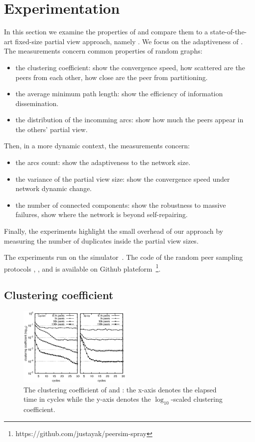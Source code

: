 \section{Experimentation}
\label{sec:experiments}

In this section we examine the properties of \SPRAY{} and compare them to a
state-of-the-art fixed-size partial view approach, namely \CYCLON{}. We focus
on the adaptiveness of \SPRAY{}. The measurements concern common properties of
random graphs:
\begin{itemize}
\item the clustering coefficient: show the convergence speed, how scattered
  are the peers from each other, how close are the peer from partitioning.
\item the average minimum path length: show the efficiency of information
  dissemination.
\item the distribution of the incomming arcs: show how much the peers appear
  in the others' partial view.
\end{itemize}
Then, in a more dynamic context, the measurements concern:
\begin{itemize}
\item the arcs count: show the adaptiveness to the network size.
\item the variance of the partial view size: show the convergence speed under
  network dynamic change.
\item the number of connected components: show the robustness to massive
  failures, show where the network is beyond self-repairing.
\end{itemize}
Finally, the experiments highlight the small overhead of our approach by
measuring the number of duplicates inside the partial view sizes.

The experiments run on the \PEERSIM{}
simulator~\cite{montresor2009peersim}. The code of the random peer sampling
protocols \CYCLON{}, \SCAMP{}, and \SPRAY{} is available on Github
plateform~\footnote{https://github.com/justayak/peersim-spray}.

\subsection{Clustering coefficient}
\label{subsec:cluster}

\begin{figure}
  \centering
  \includegraphics[width=0.49\textwidth]{img/cluster.eps}
  \caption{\label{fig:clustering}The clustering coefficient of \CYCLON{} and
    \SPRAY{}: the x-axis denotes the elapsed time in cycles while the y-axis
    denotes the $\log_{10}$-scaled clustering coefficient.}
\end{figure}

